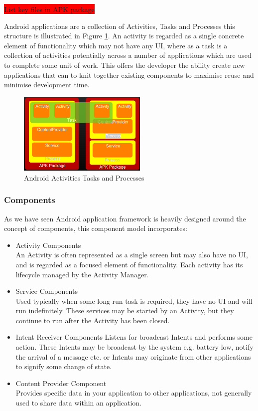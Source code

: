 \colorbox{red}{List key files in APK package}

Android applications are a collection of Activities, Tasks and Processes this structure is illustrated in Figure \ref{activity_activities_tasks_processes}. An activity is regarded as a single concrete element of functionality which may not have any UI, where as a task is a collection of activities potentially across a number of applications which are used to complete some unit of work. This offers the developer the ability create new applications that can to knit together existing components to maximise reuse and minimise development time.

\begin{figure}[h!]
\centering
    \includegraphics[width=0.55\textwidth]{research/images/activities_tasks_processes.png}
    \caption{Android Activities Tasks and Processes}%
    \label{activity_activities_tasks_processes}
\end{figure}

\subsubsection{Components}
As we have seen Android application framework is heavily designed around the concept of components, this component model incorporates:

\begin{itemize}
\item Activity Components\\
An Activity is often represented as a single screen but may also have no UI, and is regarded as a focused element of functionality. Each activity has its lifecycle managed by the Activity Manager.
\item Service Components\\
Used typically when some long-run task is required, they have no UI and will run indefinitely. These services may be started by an Activity, but they continue to run after the Activity has been closed.
\item Intent Receiver Components 
Listens for broadcast Intents and performs some action. These Intents may be broadcast by the system e.g. battery low, notify the arrival of a message etc. or Intents may originate from other applications to signify some change of state.
\item Content Provider Component\\
Provides specific data in your application to other applications, not generally used to share data within an application.
\end{itemize}

